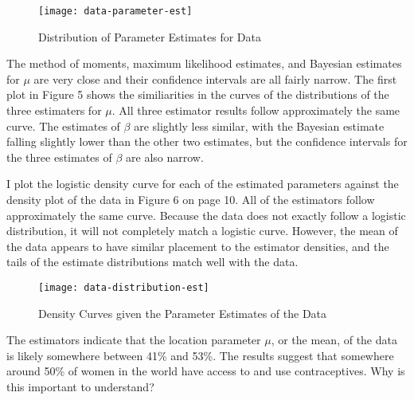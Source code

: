 \documentclass{svproc}
\begin{document}
\begin{figure}
\begin{center}
\texttt{[image: data-parameter-est]}
\label{plot5}
\caption{Distribution of Parameter Estimates for Data}
\end{center}
\end{figure}

\smallskip

The method of moments, maximum likelihood estimates, and Bayesian estimates for $\mu$ are very close and their confidence intervals are all fairly narrow. The first plot in Figure 5 shows the similiarities in the curves of the distributions of the three estimaters for $\mu$. All three estimator results follow approximately the same curve. The estimates of $\beta$ are slightly less similar, with the Bayesian estimate falling slightly lower than the other two estimates, but the confidence intervals for the three estimates of $\beta$ are also narrow. 

I plot the logistic density curve for each of the estimated parameters against the density plot of the data in Figure 6 on page 10. All of the estimators follow approximately the same curve. Because the data does not exactly follow a logistic distribution, it will not completely match a logistic curve. However, the mean of the data appears to have similar placement to the estimator densities, and the tails of the estimate distributions match well with the data.

\begin{figure}[H]
\begin{center}
\texttt{[image: data-distribution-est]}
\label{plot6}
\caption{Density Curves given the Parameter Estimates of the Data}
\end{center}
\end{figure}

The estimators indicate that the location parameter $\mu$, or the mean, of the data is likely somewhere between 41\% and 53\%. The results suggest that somewhere around 50\% of women in the world have access to and use contraceptives. Why is this important to understand?
\end{document}
